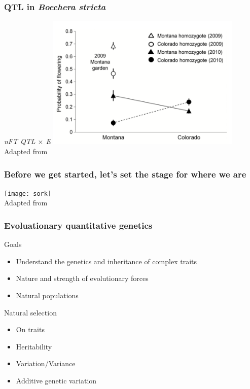 \begin{frame}
\frametitle{QTL in \textit{Boechera stricta}}
\begin{block}{\textit{nFT QTL $\times$ E}}
\centering
\includegraphics[width=0.7\textwidth]{boechera2.png}\\
\tiny
Adapted from \citet[Figure 3]{Anderson:2012cb}
\end{block}
\end{frame}





\begin{frame}
\frametitle{Before we get started, let's set the stage for where we are}
\begin{block}{}
\centering
\texttt{[image: sork]}\\
\tiny
Adapted from \citet[Figure 1]{Sork:2013tb}
\end{block}{}
\end{frame}

\begin{frame}
\frametitle{Evoluationary quantitative genetics}
\begin{block}{Goals}
\begin{itemize}
\item{Understand the genetics and inheritance of complex traits}
\item{Nature and strength of evolutionary forces}
\item{Natural populations}
\end{itemize}
\end{block}

\begin{block}{Natural selection}
\begin{itemize}
\item{On traits}
\item{Heritability}
\item{Variation/Variance}
\item{Additive genetic variation}
\end{itemize}
\end{block}
\tiny
\citet{Walsh:2008}
\end{frame}

